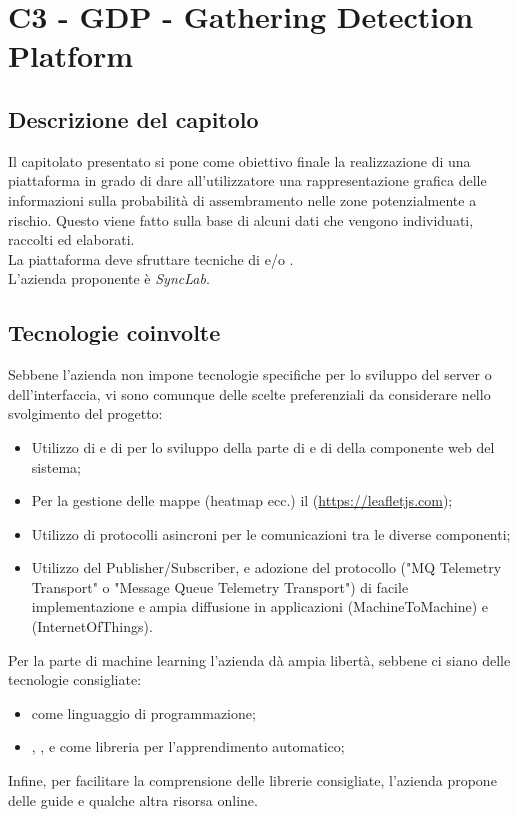 \section{C3 - GDP - Gathering Detection Platform}

\subsection{Descrizione del capitolo}
Il capitolato presentato si pone come obiettivo finale la realizzazione di una piattaforma in grado di dare all'utilizzatore una rappresentazione grafica delle informazioni sulla probabilità di assembramento nelle zone potenzialmente a rischio. Questo viene fatto sulla base di alcuni dati che vengono individuati, raccolti ed elaborati. \\
La piattaforma deve sfruttare tecniche di  e/o .\\
L'azienda proponente è \textit{SyncLab}.

\subsection{Tecnologie coinvolte}
Sebbene l'azienda non impone tecnologie specifiche per lo sviluppo del server o dell'interfaccia, vi sono comunque delle scelte preferenziali da considerare nello svolgimento del progetto:
\begin{itemize}
\item Utilizzo di  e di  per lo sviluppo della parte di  e di  della componente web del sistema;
\item Per la gestione delle mappe (heatmap ecc.) il   (\url{https://leafletjs.com});
\item Utilizzo di protocolli asincroni per le comunicazioni tra le diverse componenti;
\item Utilizzo del  Publisher/Subscriber, e adozione del protocollo  ("MQ Telemetry Transport" o "Message Queue Telemetry Transport") di facile implementazione e ampia diffusione in applicazioni  (MachineToMachine) e  (InternetOfThings).
\end{itemize}
Per la parte di machine learning l'azienda dà ampia libertà, sebbene ci siano delle tecnologie consigliate:
\begin{itemize}
\item {} come linguaggio di programmazione;
\item {}, ,  e  come libreria per l'apprendimento automatico;
\end{itemize}
Infine, per facilitare la comprensione delle librerie consigliate, l'azienda propone delle guide e qualche altra risorsa online.

